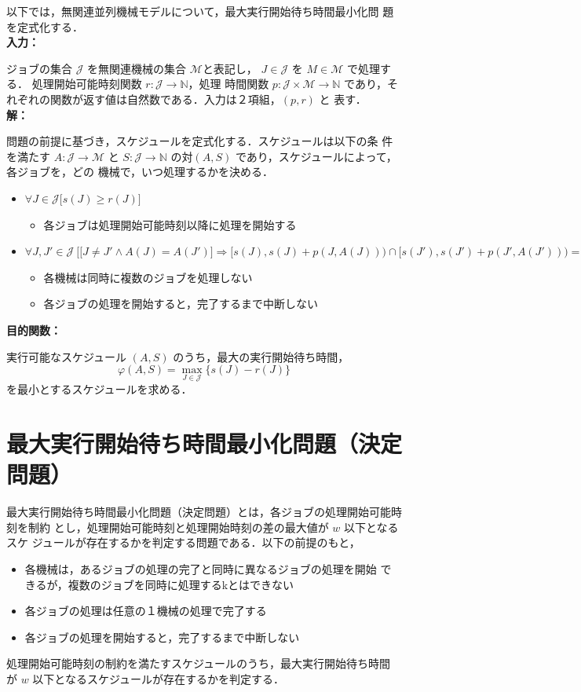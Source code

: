 \documentclass[12pt]{optlab-bachelor}
\begin{document}
以下では，無関連並列機械モデルについて，最大実行開始待ち時間最小化問
題を定式化する．\\

\noindent \textbf{入力：}

ジョブの集合 $\mathcal{J}$ を無関連機械の集合 $\mathcal{M}$と表記し，
$J \in \mathcal{J}$ を $M \in \mathcal{M}$ で処理する．
処理開始可能時刻関数 $r : \mathcal{J} \to \mathbb{N}$，処理
時間関数 $p : \mathcal{J} \times \mathcal{M} \to \mathbb{N}$
であり，それぞれの関数が返す値は自然数である．入力は２項組，$(p,r)$ と
表す．\\

\noindent \textbf{解：}

問題の前提に基づき，スケジュールを定式化する．スケジュールは以下の条
件を満たす $A : \mathcal{J} \to \mathcal{M}$ と $S : \mathcal{J} \to
\mathbb{N}$ の対$(A,S)$ であり，スケジュールによって，各ジョブを，どの
機械で，いつ処理するかを決める．
\begin{itemize}
\item $\forall J \in \mathcal{J}\big[s(J) \ge r(J) \big]$
  \begin{itemize}
  \item 各ジョブは処理開始可能時刻以降に処理を開始する
  \end{itemize}
\item $\forall J, J' \in \mathcal{J}\ \Big[ \big[J\neq J' \land A(J) = A(J')\big] \Rightarrow [s(J), s(J)+p(J,A(J))) \cap[s(J'), s(J')+p(J', A(J'))) = \emptyset \Big]$
  \begin{itemize}
  \item 各機械は同時に複数のジョブを処理しない
  \item 各ジョブの処理を開始すると，完了するまで中断しない
  \end{itemize}
\end{itemize}

\noindent \textbf{目的関数：}

実行可能なスケジュール $(A,S)$ のうち，最大の実行開始待ち時間，
$$\varphi(A,S) = \displaystyle \max_{J \in \mathcal{J}}\{s(J) -
r(J)\}$$
を最小とするスケジュールを求める．

\section{最大実行開始待ち時間最小化問題（決定問題）}
最大実行開始待ち時間最小化問題（決定問題）とは，各ジョブの処理開始可能時刻を制約
とし，処理開始可能時刻と処理開始時刻の差の最大値が $w$ 以下となるスケ
ジュールが存在するかを判定する問題である．以下の前提のもと，
\begin{itemize}
\item 各機械は，あるジョブの処理の完了と同時に異なるジョブの処理を開始
  できるが，複数のジョブを同時に処理するkとはできない
\item 各ジョブの処理は任意の１機械の処理で完了する
\item 各ジョブの処理を開始すると，完了するまで中断しない
\end{itemize}
処理開始可能時刻の制約を満たすスケジュールのうち，最大実行開始待ち時間
が $w$ 以下となるスケジュールが存在するかを判定する．
\end{document}
